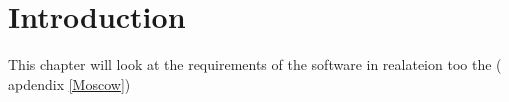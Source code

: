 
\section*{Introduction}
This chapter will look at the requirements of the software in realateion too the  ( apdendix \ref{Moscow})